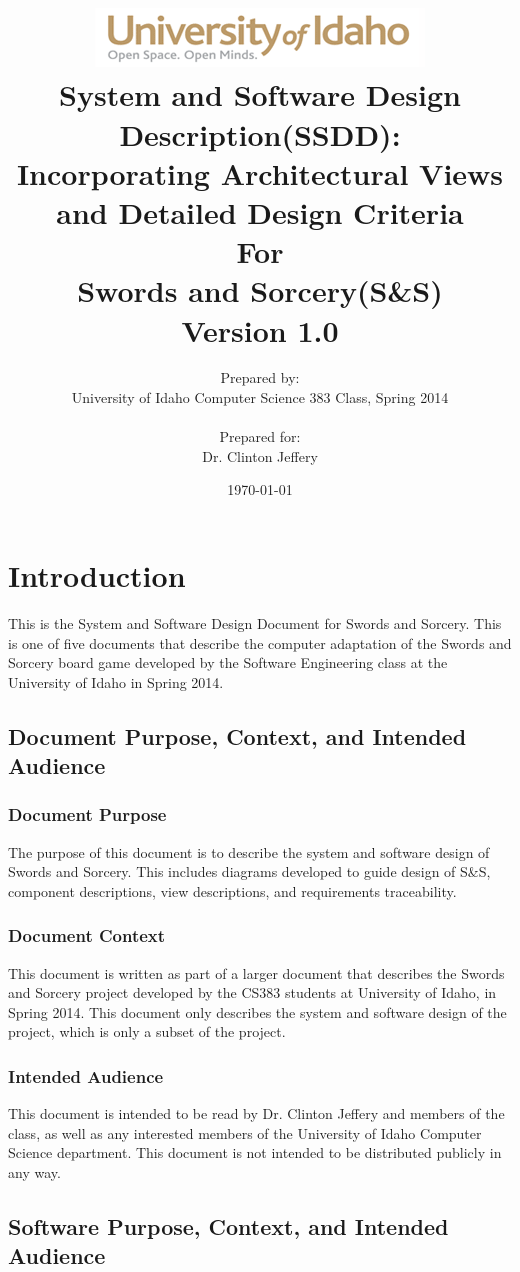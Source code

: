 \documentclass[12pt,a4paper,titlepage]{article}
\title{ \center\includegraphics[width=\linewidth]{UIGraphic}\\
		\center\textbf{\Large{System and Software Design Description(SSDD):}\\
		\large{Incorporating Architectural Views and Detailed Design Criteria\\
		For\\
		\large{Swords and Sorcery(S\&S)}}\\
		Version 1.0}}
\author{Prepared by:\\University of Idaho Computer Science 383 Class, Spring 2014\\
\bigskip\\
Prepared for:\\
Dr. Clinton Jeffery\\}
\date{\today}
\begin{document}
\maketitle
\pagebreak
\setcounter{tocdepth}{3}
\renewcommand\contentsname{\center{Swords and Sorcery Design\\Table of Contents}}
\tableofcontents
\pagebreak

\section{Introduction}
This is the System and Software Design Document for Swords and Sorcery. This is one of five documents that describe the computer adaptation of the Swords and Sorcery board game developed by the Software Engineering class at the University of Idaho in Spring 2014.
\subsection{Document Purpose, Context, and Intended Audience}
\subsubsection{Document Purpose}
The purpose of this document is to describe the system and software design of Swords and Sorcery. This includes diagrams developed to guide design of S\&S, component descriptions, view descriptions, and requirements traceability.
\subsubsection{Document Context}
This document is written as part of a larger document that describes the Swords and Sorcery project developed by the CS383 students at University of Idaho, in Spring 2014. This document only describes the system and software design of the project, which is only a subset of the project.
\subsubsection{Intended Audience}
This document is intended to be read by Dr. Clinton Jeffery and members of the class, as well as any interested members of the University of Idaho Computer Science department. This document is not intended to be distributed publicly in any way.
\subsection{Software Purpose, Context, and Intended Audience}
\end{document}
